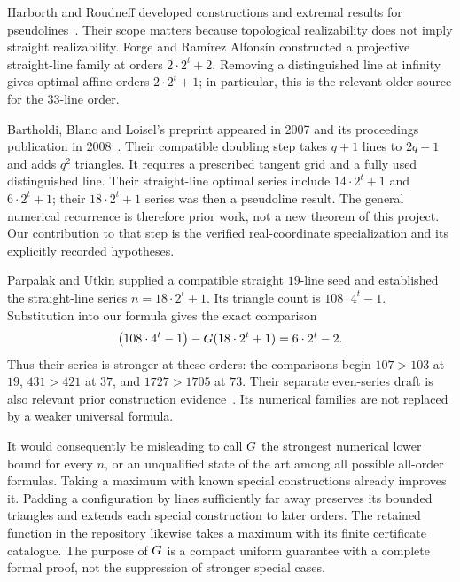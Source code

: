 Harborth and Roudneff developed constructions and extremal results for pseudolines~\citep{harborth1985,roudneff1996}. Their scope matters because topological realizability does not imply straight realizability. Forge and Ram\'irez Alfons\'in constructed a projective straight-line family at orders $2\cdot2^t+2$\citep{forge1998}. Removing a distinguished line at infinity gives optimal affine orders $2\cdot2^t+1$; in particular, this is the relevant older source for the $33$-line order.

Bartholdi, Blanc and Loisel's preprint appeared in 2007 and its proceedings publication in 2008~\citep{bbl2008}. Their compatible doubling step takes $q+1$ lines to $2q+1$ and adds $q^2$ triangles. It requires a prescribed tangent grid and a fully used distinguished line. Their straight-line optimal series include $14\cdot2^t+1$ and $6\cdot2^t+1$; their $18\cdot2^t+1$ series was then a pseudoline result. The general numerical recurrence is therefore prior work, not a new theorem of this project. Our contribution to that step is the verified real-coordinate specialization and its explicitly recorded hypotheses.

Parpalak and Utkin supplied a compatible straight $19$-line seed and established the straight-line series $n=18\cdot2^t+1$\citep{parpalakutkin2026}. Its triangle count is $108\cdot4^t-1$. Substitution into our formula gives the exact comparison
\begin{equation}
 \bigl(108\cdot4^t-1\bigr)-G(18\cdot2^t+1)=6\cdot2^t-2.
 \label{lit:pu-gap}
\end{equation}
Thus their series is stronger at these orders: the comparisons begin $107>103$ at $19$, $431>421$ at $37$, and $1727>1705$ at $73$. Their separate even-series draft is also relevant prior construction evidence~\citep{parpalakutkinEven2026}. Its numerical families are not replaced by a weaker universal formula.

It would consequently be misleading to call $G$ the strongest numerical lower bound for every $n$, or an unqualified state of the art among all possible all-order formulas. Taking a maximum with known special constructions already improves it. Padding a configuration by lines sufficiently far away preserves its bounded triangles and extends each special construction to later orders. The retained function in the repository likewise takes a maximum with its finite certificate catalogue. The purpose of $G$ is a compact uniform guarantee with a complete formal proof, not the suppression of stronger special cases.

